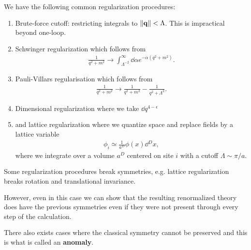 We have the following common regularization procedures:
\begin{enumerate}[label=\alph*)]
    \item Brute-force cutoff: restricting integrals to $\left\|\vb{q}\right\| < \Lambda$. This is impractical beyond one-loop.
    \item Schwinger regularization which follows from
        \begin{align*}
            \frac{1}{q^2 + m^2} \to \int_{\Lambda^{-2}}^{\infty} \dd{\alpha} e^{-\alpha \left( q^2 + m^2 \right) }
        .\end{align*}
    \item Pauli-Villars regularisation which follows from
        \begin{align*}
            \frac{1}{q^2 + m^2} \to \frac{1}{q^2 + m^2 } - \frac{1}{q^2 + \Lambda^2}
        .\end{align*}
    \item Dimensional regularization where we take $\dd{q}^{4- \epsilon}$
    \item and lattice regularization where we quantize space and replace fields by a lattice variable
        \begin{align*}
            \phi_i \simeq \frac{1}{a^{D}} \phi \left( x \right) \dd{^{D}x}
        ,\end{align*}
        where we integrate over a volume $a^{D}$ centered on site $i$ with a cutoff $\Lambda \sim  \pi/a$.
\end{enumerate}

Some regularization procedures break symmetries, e.g. lattice regularization breaks rotation and translational invariance.

However, even in this case we can show that the resulting renormalized theory does have the previous symmetries even if they were not present through every step of the calculation.

There also exists cases where the classical symmetry cannot be preserved and this is what is called an \textbf{anomaly}.






